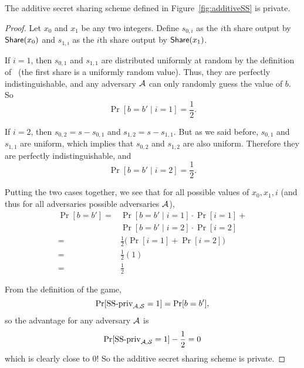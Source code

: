 \begin{theorem}
    The additive secret sharing scheme defined in Figure~\ref{fig:additiveSS}
    is private.
\end{theorem}
\begin{proof}
    Let $x_0$ and $x_1$ be any two integers. Define $s_{0,i}$ as
    the $i$th share output by $\mathsf{Share}(x_0)$ and $s_{1,i}$ as the 
    $i$th share output by $\mathsf{Share}(x_1)$.

    If $i=1$, then $s_{0,1}$ and $s_{1,1}$ are distributed uniformly 
    at random by the definition of \share~(the first share is 
    a uniformly random value). Thus, they are perfectly indistinguishable,
    and any adversary $\mathcal{A}$ can only randomly guess the value of $b$.
    So
    \[
        \Pr[b=b' \mid i=1] = \frac{1}{2}.
    \]

    If $i=2$, then $s_{0,2} = s-s_{0,1}$ and $s_{1,2} = s-s_{1,1}$.
    But as we said before, $s_{0,1}$ and $s_{1,1}$ are uniform,
    which implies that $s_{0,2}$ and $s_{1,2}$ are also uniform.
    Therefore they are perfectly indistinguishable, and 
    \[
        \Pr[b=b' \mid i=2] = \frac{1}{2}.
    \]

    Putting the two cases together, we see that for all possible 
    values of $x_0, x_1, i$ (and thus for all adversaries possible
    adversaries $\mathcal{A}$),
    \begin{align*}
        \Pr[b=b']
        =& \Pr[b=b' \mid i=1]\cdot\Pr[i=1] + \\
        & \Pr[b=b' \mid i=2]\cdot\Pr[i=2]\\
        =& \frac{1}{2} \big(\Pr[i=1]+\Pr[i=2]\big)\\
        =& \frac{1}{2}(1)\\
        =& \frac{1}{2}
    \end{align*}

    From the definition of the game, 
    \[
        \Pr[\text{SS-priv}_{\mathcal{A},\mathcal{S}}=1] = \Pr[b=b'],
    \]
    so the advantage for any adversary $\mathcal{A}$ is
    \[
        \Pr[\text{SS-priv}_{\mathcal{A},\mathcal{S}}=1] - \frac{1}{2} = 0
    \]
    which is clearly close to 0! So the additive secret sharing 
    scheme is private.
\end{proof}
